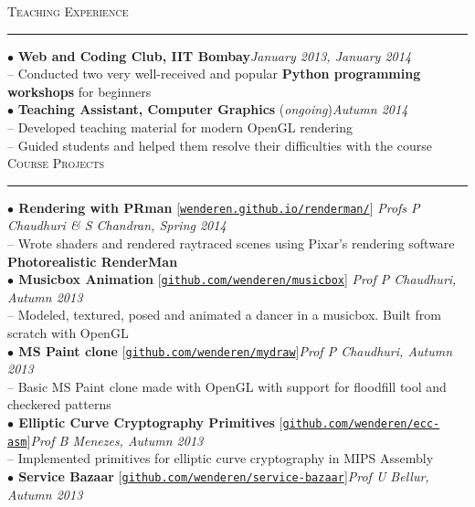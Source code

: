 \documentclass[a4paper,9pt]{article}
\begin{document}
\Large{\textsc{Teaching Experience}}\vspace{1.5pt}
\hrule\vspace{0.25cm}
\normalsize
$\bullet$ \textbf{Web and Coding Club, IIT Bombay}\hfill \textit{January 2013, January 2014}\\
-- Conducted two very well-received and popular \textbf{Python programming workshops} for beginners\\
$\bullet$ \textbf{Teaching Assistant, Computer Graphics} (\textit{ongoing})\hfill \textit{Autumn 2014}\\
-- Developed teaching material for modern OpenGL rendering\\
-- Guided students and helped them resolve their difficulties with the course\\

\Large{\textsc{Course Projects}}\vspace{1.5pt}
\hrule\vspace{0.25cm}
\normalsize
\textbf{$\bullet$ Rendering with PRman} [\href{https://wenderen.github.io/renderman/}{\texttt{wenderen.github.io/renderman/}}] \hfill \textit{Profs P Chaudhuri \& S Chandran, Spring 2014}\\
-- Wrote shaders and rendered raytraced scenes using Pixar's rendering software \textbf{Photorealistic RenderMan}\\
\textbf{$\bullet$ Musicbox Animation} [\href{https://github.com/wenderen/musicbox}{\texttt{github.com/wenderen/musicbox}}] \hfill \textit{Prof P Chaudhuri, Autumn 2013}\\
-- Modeled, textured, posed and animated a dancer in a musicbox. Built from scratch with OpenGL\\
\textbf{$\bullet$ MS Paint clone} [\href{https://github.com/wenderen/mydraw}{\texttt{github.com/wenderen/mydraw}}]\hfill \textit{Prof P Chaudhuri, Autumn 2013}\\
-- Basic MS Paint clone made with OpenGL with support for floodfill tool and checkered patterns\\
\textbf{$\bullet$ Elliptic Curve Cryptography Primitives} [\href{https://github.com/wenderen/ecc-asm}{\texttt{github.com/wenderen/ecc-asm}}]\hfill \textit{Prof B Menezes, Autumn 2013}\\
-- Implemented primitives for elliptic curve cryptography in MIPS Assembly\\
\textbf{$\bullet$ Service Bazaar} [\href{https://github.com/wenderen/service-bazaar}{\texttt{github.com/wenderen/service-bazaar}}]\hfill \textit{Prof U Bellur, Autumn 2013}\\
\end{document}

